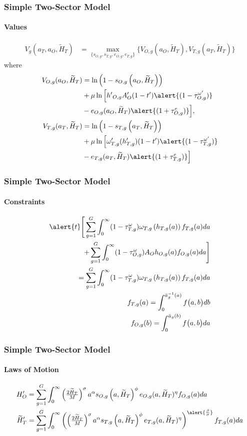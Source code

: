 \documentclass[11pt]{beamer}
\begin{document}
	
	\begin{frame}
		\frametitle{Simple Two-Sector Model}
		\framesubtitle{Values}
		\begin{align*}
			\label{}
			V_g(a_T,a_O,\widetilde{H}_T) & = \max_{\{s_{O,g},s_{T,g},e_{O,g},e_{T,g}\}} \bigg\{ V_{O,g}(a_O,\widetilde{H}_T), V_{T,g}(a_T,\widetilde{H}_T) \bigg\} \label{eq:V}
		\end{align*}
		where
		\begin{align*}
			V_{O,g}(a_O,\widetilde{H}_T) & = \ln\left(1-s_{O,g}\left(a_O,\widetilde{H}_T\right)\right) \nonumber \\
			& + \mu \ln \Big[ {{h'}_{O,g}} A_O'(1-t')\alert{(1-\tau^{\omega '}_{O,g})} \nonumber \\
			& - e_{O,g}(a_O,\widetilde{H}_T)\alert{(1+\tau^e_{O,g})} \Big],\\
			V_{T,g}(a_T,\widetilde{H}_T) & = \ln\left(1-s_{T,g}\left(a_T,\widetilde{H}_T\right)\right) \nonumber \\
			& + \mu \ln \Big[ \omega_{T,g}'({h_{T,g}'})(1-t')\alert{(1-\tau^{\omega '}_{T,g}) }\nonumber \\
			& - e_{T,g}(a_T,\widetilde{H}_T)\alert{(1+\tau^{e }_{T,g})} \Big] 
		\end{align*}
	\end{frame}
	
	\begin{frame}
		\frametitle{Simple Two-Sector Model}
		\framesubtitle{Constraints}
		\begin{align*}
			\alert{t}\Bigg[ \sum_{g=1}^G \int_0^\infty (1-\tau^{\omega}_{T,g})\omega_{T,g}\left(h_{T,g}(a)\right) f_{T,g}(a) da  \\
			+ \sum_{g=1}^G \int_0^\infty (1-\tau^{\omega}_{O,g})A_O h_{O,g}(a) f_{O,g}(a) da \Bigg]\\
			= \sum_{g=1}^G \int_0^\infty (1-\tau^{\omega}_{T,g})\omega_{T,g}\left(h_{T,g}(a)\right) f_{T,g}(a) da \\
			f_{T,g}(a)  = \int_0^{\bar{a}_g^{-1}\left(a\right)} f\big(a,b \big) db \\
			f_{O,g}(b)  = \int_0^{\bar{a}_g\left(b\right)} f\big(a,b \big) da 
		\end{align*}		
	\end{frame}

 \begin{frame}
		\frametitle{Simple Two-Sector Model}
		\framesubtitle{Laws of Motion}
		\begin{align*}
			{H}_{O}' & = \sum_{g=1}^G \int_0^\infty \left(\tfrac{2 \widetilde{H}_T}{M}\right)^\sigma a^\alpha s_{O,g}\left(a,\widetilde{H}_T\right)^\phi e_{O,g}(a,\widetilde{H}_T)^\eta  f_{O,g}(a) da \\
			\widetilde{H}_{T}' & = \sum_{g=1}^G \int_0^\infty \left(\left(\tfrac{2 \widetilde{H}_T}{M}\right)^\sigma a^\alpha s_{T,g}\left(a,\widetilde{H}_T\right)^\phi e_{T,g}(a,\widetilde{H}_T)^\eta \right)^{\alert{\frac{\beta}{\sigma}}} f_{T,g}(a) da 
		\end{align*}
	\end{frame}
	
\end{document}
